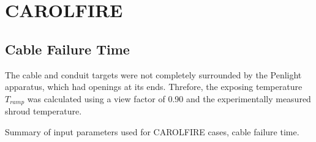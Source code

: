 \clearpage


\section{CAROLFIRE}

\subsection*{Cable Failure Time}

The cable and conduit targets were not completely surrounded by the Penlight apparatus, which had openings at its ends. Threfore, the exposing temperature $T_{ramp}$ was calculated using a view factor of 0.90 and the experimentally measured shroud temperature.

\begin{table}[!ht]
\caption[Input parameters for CAROLFIRE cases, cable failure time]
{Summary of input parameters used for CAROLFIRE cases, cable failure time.}


\end{table}
